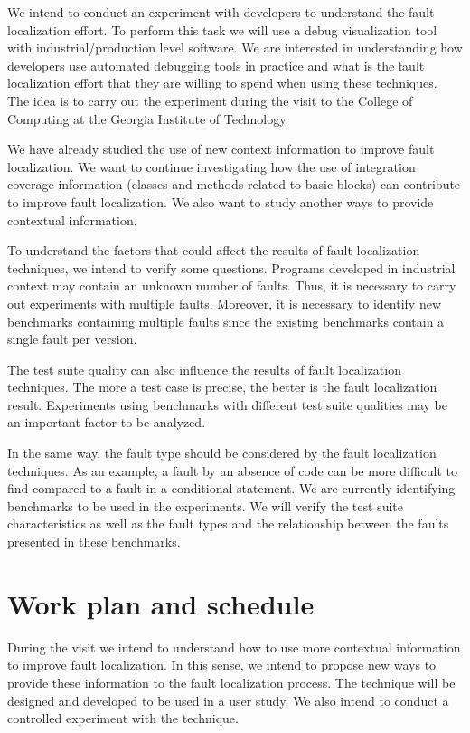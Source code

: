 \documentclass[12pt,a4paper,espaco=umemeio,noindentfirst,oneside,openany,tocpage=plain,pnumromarab,ruledheader,time,anapcustomindent]{sty/abnt}
\begin{document}
We intend to conduct an experiment with developers to understand the fault localization effort. To perform this task we will use a debug visualization 
tool with industrial/production level software. We are interested in understanding how developers use automated debugging tools in practice and what is the fault 
localization effort that they are willing to spend when using these techniques. The idea is to carry out the experiment during the visit to the College of Computing 
at the Georgia Institute of Technology.

We have already studied the use of new context information to improve fault localization. We want to continue investigating how the use of integration coverage 
information (classes and methods related to basic blocks) can contribute to improve fault localization. We also want to study another ways to provide contextual 
information.

To understand the factors that could affect the results of fault localization techniques, we intend to verify some questions. Programs developed in industrial context 
may contain an unknown number of faults. Thus, it is necessary to carry out experiments with multiple faults. Moreover, it is necessary to identify new benchmarks 
containing multiple faults since the existing benchmarks contain a single fault per version.

The test suite quality can also influence the results of fault localization techniques. The more a test case is precise, the better is the fault localization result. 
Experiments using benchmarks with different test suite qualities may be an important factor to be analyzed.

In the same way, the fault type should be considered by the fault localization techniques. As an example, a fault by an absence of code can be more difficult to find 
compared to a fault in a conditional statement. We are currently identifying benchmarks to be used in the experiments. We will verify the test suite characteristics 
as well as the fault types and the relationship between the faults presented in these benchmarks.						


\section{Work plan and schedule}
\label{workplan}

During the visit we intend to understand how to use more contextual information to improve fault localization. In this sense, we intend to propose new ways to provide 
these information to the fault localization process. The technique will be designed and developed to be used in a user study. We also intend to conduct a controlled 
experiment with the technique. 
\end{document}
